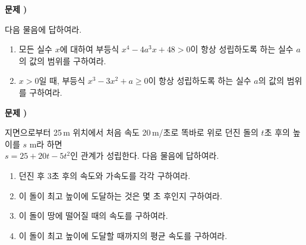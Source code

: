 \documentclass[a4paper]{oblivoir}
\newcounter{num}
\newcommand\prob[1]
{\vs\bigskip\bigskip\par\noindent\stepcounter{num} \textbf{문제 \thenum) #1}\par\noindent}
\newcommand\vs[1]{\vspace{40pt}}
\begin{document}
%
\prob{}
다음 물음에 답하여라.
\begin{enumerate}[(1)]
\item
모든 실수 \(x\)에 대하여 부등식 \(x^4-4a^3x+48>0\)이 항상 성립하도록 하는 실수 \(a\)의 값의 범위를 구하여라.
\item
\(x>0\)일 때, 부등식 \(x^3-3x^2+a\ge0\)이 항상 성립하도록 하는 실수 \(a\)의 값의 범위를 구하여라.
\end{enumerate}

%
\prob{}
지면으로부터 25\,m 위치에서 처음 속도 20\,m/초로 똑바로 위로 던진 돌의 \(t\)초 후의 높이를 \(s\) m라 하면 \\\(s=25+20t-5t^2\)인 관계가 성립한다.
다음 물음에 답하여라.
\begin{enumerate}[(1)]
\item
던진 후 \(3\)초 후의 속도와 가속도를 각각 구하여라.
\item
이 돌이 최고 높이에 도달하는 것은 몇 초 후인지 구하여라.
\item
이 돌이 땅에 떨어질 때의 속도를 구하여라.
\item
이 돌이 최고 높이에 도달할 때까지의 평균 속도를 구하여라.
\end{enumerate}
\end{document}
